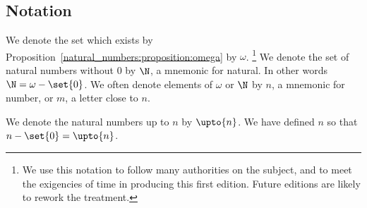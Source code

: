 \subsection*{Notation}

We denote the set which exists by Proposition~\ref{natural_numbers:proposition:omega} by $\omega $.
  \ifhmode\unskip\fi\footnote{
We use this notation to follow many authorities on the subject, and to meet the exigencies of time in producing this first edition. Future editions are likely to rework the treatment.
  }
We denote the set of natural numbers without 0 by $\N $, a mnemonic for natural.
In other words $\N  = \omega  - \set{0}$.
We often denote elements of $\omega $ or $\N $ by $n$, a mnemonic for number, or $m$, a letter close to $n$.

We denote the natural numbers up to $n$ by $\upto{n}$.
We have defined $n$ so that $n - \set{0} = \upto{n}$.


